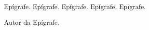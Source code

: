 \null\
\vfill

\hfill \parbox{9.0cm} {\noindent Epígrafe. Epígrafe. Epígrafe. Epígrafe. Epígrafe. 


\vspace{0.5cm}

\noindent Autor da Epígrafe. }
\setcounter{page}{2}  %
